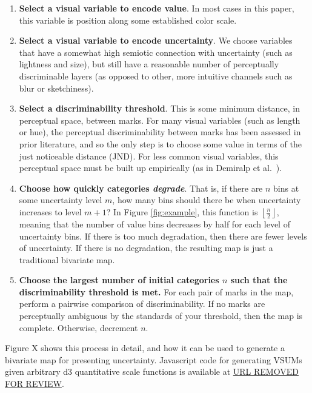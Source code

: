 \documentclass{vgtc}                          %
\begin{document}
\begin{enumerate}
	\item \textbf{Select a visual variable to encode value}. In most cases in this paper, this variable is position along some established color scale.
	\item \textbf{Select a visual variable to encode uncertainty}. We choose variables that have a somewhat high semiotic connection with uncertainty (such as lightness and size), but still have a reasonable number of perceptually discriminable layers (as opposed to other, more intuitive channels such as blur or sketchiness).
	\item \textbf{Select a discriminability threshold}. This is some minimum distance, in perceptual space, between marks. For many visual variables (such as length or hue), the perceptual discriminability between marks has been assessed in prior literature, and so the only step is to choose some value in terms of the just noticeable distance (JND). For less common visual variables, this perceptual space must be built up empirically (as in Demiralp et al.~\cite{demiralp2014learning}).
	\item \textbf{Choose how quickly categories \emph{degrade}}. That is, if there are $n$ bins at some uncertainty level $m$, how many bins should there be when uncertainty increases to level $m+1$? In Figure \ref{fig:example}, this function is $\left \lfloor {\frac{n}{2}}\right \rfloor$, meaning that the number of value bins decreases by half for each level of uncertainty bins. If there is too much degradation, then there are fewer levels of uncertainty. If there is no degradation, the resulting map is just a traditional bivariate map. 
	\item \textbf{Choose the largest number of initial categories $n$ such that the discriminability threshold is met.} For each pair of marks in the map, perform a pairwise comparison of discriminability. If no marks are perceptually ambiguous by the standards of your threshold, then the map is complete. Otherwise, decrement $n$. 
\end{enumerate}

Figure X shows this process in detail, and how it can be used to generate a bivariate map for presenting uncertainty. Javascript code for generating VSUMs given arbitrary d3 quantitative scale functions is available at \url{URL REMOVED FOR REVIEW}.
\end{document}
